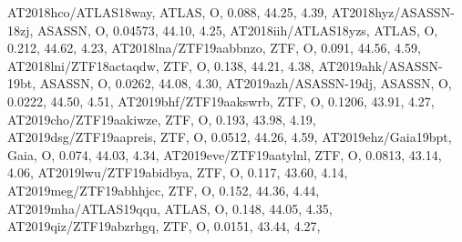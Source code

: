 AT2018hco/ATLAS18way, ATLAS, O,     0.088, 44.25, 4.39, \cite{vanVelzen2020}
AT2018hyz/ASASSN-18zj, ASASSN, O,     0.04573, 44.10, 4.25, \cite{Gomez2020}
AT2018iih/ATLAS18yzs, ATLAS, O,      0.212, 44.62, 4.23, \cite{vanVelzen2020}
AT2018lna/ZTF19aabbnzo, ZTF, O,     0.091, 44.56, 4.59, \cite{vanVelzen2020}
AT2018lni/ZTF18actaqdw, ZTF, O,      0.138, 44.21, 4.38, \cite{vanVelzen2020}
AT2019ahk/ASASSN-19bt, ASASSN, O,     0.0262, 44.08, 4.30, \cite{Holoien2019}
AT2019azh/ASASSN-19dj, ASASSN, O,     0.0222, 44.50, 4.51, \cite{vanVelzen2020}
AT2019bhf/ZTF19aakswrb, ZTF, O,      0.1206, 43.91, 4.27, \cite{vanVelzen2020}
AT2019cho/ZTF19aakiwze, ZTF, O,      0.193, 43.98, 4.19, \cite{vanVelzen2020}
AT2019dsg/ZTF19aapreis, ZTF, O,       0.0512, 44.26, 4.59, \cite{vanVelzen2020}
AT2019ehz/Gaia19bpt, Gaia, O,     0.074, 44.03, 4.34, \cite{vanVelzen2020}
AT2019eve/ZTF19aatylnl, ZTF, O,     0.0813, 43.14, 4.06, \cite{vanVelzen2020}
AT2019lwu/ZTF19abidbya, ZTF, O,      0.117, 43.60, 4.14, \cite{vanVelzen2020}
AT2019meg/ZTF19abhhjcc, ZTF, O,      0.152, 44.36, 4.44, \cite{vanVelzen2020}
AT2019mha/ATLAS19qqu, ATLAS, O,      0.148, 44.05, 4.35, \cite{vanVelzen2020}
AT2019qiz/ZTF19abzrhgq, ZTF, O,     0.0151, 43.44, 4.27, \cite{vanVelzen2020}